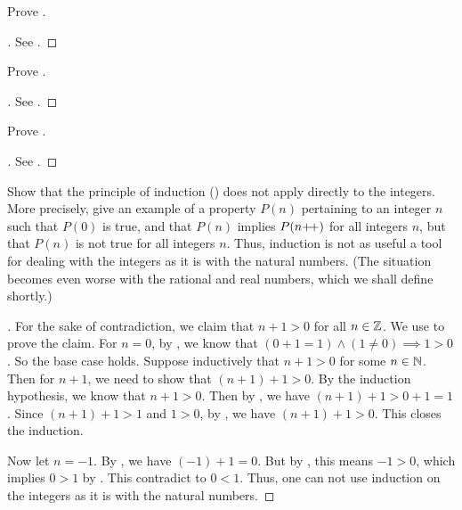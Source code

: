 \begin{ex}\label{i:ex:4.1.5}
  Prove .
\end{ex}

\begin{proof}[]
  See .
\end{proof}

\begin{ex}\label{i:ex:4.1.6}
  Prove .
\end{ex}

\begin{proof}[]
  See .
\end{proof}

\begin{ex}\label{i:ex:4.1.7}
  Prove .
\end{ex}

\begin{proof}[]
  See .
\end{proof}

\begin{ex}\label{i:ex:4.1.8}
  Show that the principle of induction () does not apply directly to the integers.
  More precisely, give an example of a property \(P(n)\) pertaining to an integer \(n\) such that \(P(0)\) is true, and that \(P(n)\) implies \(P(n{+}\!{+})\) for all integers \(n\), but that \(P(n)\) is not true for all integers \(n\).
  Thus, induction is not as useful a tool for dealing with the integers as it is with the natural numbers.
  (The situation becomes even worse with the rational and real numbers, which we shall define shortly.)
\end{ex}

\begin{proof}[]
  For the sake of contradiction, we claim that \(n + 1 > 0\) for all \(n \in \mathbb{Z}\).
  We use  to prove the claim.
  For \(n = 0\), by , we know that \((0 + 1 = 1) \land (1 \neq 0) \implies 1 > 0\).
  So the base case holds.
  Suppose inductively that \(n + 1 > 0\) for some \(n \in \mathbb{N}\).
  Then for \(n + 1\), we need to show that \((n + 1) + 1 > 0\).
  By the induction hypothesis, we know that \(n + 1 > 0\).
  Then by , we have \((n + 1) + 1 > 0 + 1 = 1\).
  Since \((n + 1) + 1 > 1\) and \(1 > 0\), by , we have \((n + 1) + 1 > 0\).
  This closes the induction.

  Now let \(n = -1\).
  By , we have \((-1) + 1 = 0\).
  But by , this means \(-1 > 0\), which implies \(0 > 1\) by .
  This contradict to \(0 < 1\).
  Thus, one can not use induction on the integers as it is with the natural numbers.
\end{proof}
